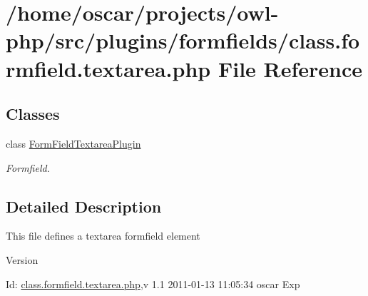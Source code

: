 \section{/home/oscar/projects/owl-\/php/src/plugins/formfields/class.formfield.textarea.php File Reference}
\label{class_8formfield_8textarea_8php}
\subsection*{Classes}
\begin{DoxyCompactItemize}
\item 
class \hyperlink{classFormFieldTextareaPlugin}{FormFieldTextareaPlugin}
\begin{DoxyCompactList}\small\item\em Formfield. \item\end{DoxyCompactList}\end{DoxyCompactItemize}


\subsection{Detailed Description}
This file defines a textarea formfield element \begin{DoxyVersion}{Version}

\end{DoxyVersion}
\begin{DoxyParagraph}{Id:}
\hyperlink{class_8formfield_8textarea_8php}{class.formfield.textarea.php},v 1.1 2011-\/01-\/13 11:05:34 oscar Exp 
\end{DoxyParagraph}

